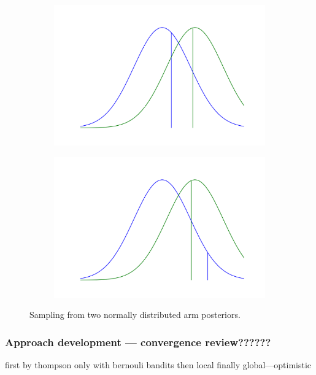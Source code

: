 \documentclass[12pt, a4paper, pdflatex, leqno]{report}
\begin{document}
\begin{figure}[htbp]
\centering
  \begin{subfigure}[b]{0.49\textwidth}
    \centering
    \includegraphics[width=0.99\linewidth]{graphics/sim1.png}
    \caption{\label{fig:sim1}}
  \end{subfigure}
  \begin{subfigure}[b]{0.49\textwidth}
    \centering
    \includegraphics[width=0.99\linewidth]{graphics/sim2.png}
    \caption{\label{fig:sim2}}
  \end{subfigure}
\begin{tiny}
\caption{Sampling from two normally distributed arm posteriors.\label{fig:sim}}
\end{tiny}
\vspace{1cm}
\end{figure}

\subsubsection{Approach development --- \textbf{convergence review??????}}
first by thompson only with bernouli bandits then local finally global---optimistic
\end{document}
